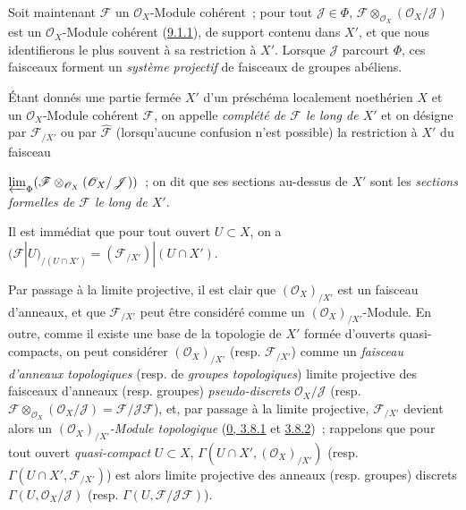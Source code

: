 \begin{env}[10.8.3]
\label{I.10.8.3-fr}
Soit maintenant $\mathscr{F}$ un $\mathscr{O}_X$-Module cohérent~; pour
tout $\mathscr{J}\in\Phi$,
$\mathscr{F}\otimes_{\mathscr{O}_X}(\mathscr{O}_X/\mathscr{J})$ est un
$\mathscr{O}_X$-Module cohérent
(\hyperref[I.9.1.1-fr]{9.1.1}), de support contenu dans $X'$, et que nous
identifierons le plus souvent à sa restriction à $X'$. Lorsque
$\mathscr{J}$ parcourt $\Phi$, ces faisceaux forment un
\emph{système projectif} de faisceaux de groupes abéliens.
\end{env}

\begin{definition}[10.8.4]
\label{I.10.8.4-fr}
Étant donnés une partie fermée $X'$ d'un préschéma localement noethérien
$X$ et un $\mathscr{O}_X$-Module cohérent $\mathscr{F}$, on appelle
\emph{complété de $\mathscr{F}$ le long de $X'$} et on désigne par
$\mathscr{F}_{/X'}$ ou par $\widehat{\mathscr{F}}$ (lorsqu'aucune confusion
n'est possible) la restriction à $X'$ du faisceau


$\varprojlim_{\Phi}
(\mathscr{F}\otimes_{\mathscr{O}_X}
(\mathscr{O}_X/\mathscr{J}))$~; on dit que ses sections au-dessus de $X'$ sont
les \emph{sections formelles de $\mathscr{F}$ le long de $X'$}.
\end{definition}

Il est immédiat que pour tout ouvert $U\subset X$, on a
$(\mathscr{F}|U)_{/(U\cap X')}=(\mathscr{F}_{/X'})|(U\cap X')$.

Par passage à la limite projective, il est clair que
$(\mathscr{O}_X)_{/X'}$ est un faisceau d'anneaux, et que
$\mathscr{F}_{/X'}$ peut être considéré comme un
$(\mathscr{O}_X)_{/X'}$-Module. En outre, comme il existe une base de la
topologie de $X'$ formée d'ouverts quasi-compacts, on peut considérer
$(\mathscr{O}_X)_{/X'}$ (resp. $\mathscr{F}_{/X'}$) comme un
\emph{faisceau d'anneaux topologiques} (resp. de
\emph{groupes topologiques}) limite projective des faisceaux d'anneaux
(resp. groupes) \emph{pseudo-discrets}
$\mathscr{O}_X/\mathscr{J}$ (resp.
$\mathscr{F}\otimes_{\mathscr{O}_X}
(\mathscr{O}_X/\mathscr{J})=\mathscr{F}/\mathscr{J}\mathscr{F}$), et, par
passage à la limite projective, $\mathscr{F}_{/X'}$ devient alors un
\emph{$(\mathscr{O}_X)_{/X'}$-Module topologique}
(\hyperref[0.3.8.1-fr]{0, 3.8.1} et
\hyperref[0.3.8.2-fr]{3.8.2})~; rappelons que pour tout ouvert
\emph{quasi-compact} $U\subset X$,
$\Gamma(U\cap X',(\mathscr{O}_X)_{/X'})$ (resp.
$\Gamma(U\cap X',\mathscr{F}_{/X'})$) est alors limite projective des
anneaux (resp. groupes) discrets $\Gamma(U,\mathscr{O}_X/\mathscr{J})$
(resp. $\Gamma(U,\mathscr{F}/\mathscr{J}\mathscr{F})$).

